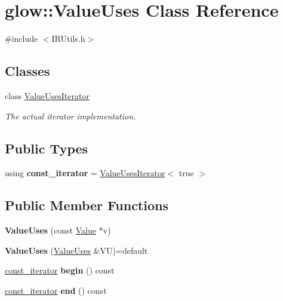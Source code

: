 \hypertarget{classglow_1_1_value_uses}{}\section{glow\+:\+:Value\+Uses Class Reference}
\label{classglow_1_1_value_uses}


{\ttfamily \#include $<$I\+R\+Utils.\+h$>$}

\subsection*{Classes}
\begin{DoxyCompactItemize}
\item 
class \hyperlink{classglow_1_1_value_uses_1_1_value_uses_iterator}{Value\+Uses\+Iterator}
\begin{DoxyCompactList}\small\item\em The actual iterator implementation. \end{DoxyCompactList}\end{DoxyCompactItemize}
\subsection*{Public Types}
\begin{DoxyCompactItemize}
\item 
\mbox{\label{classglow_1_1_value_uses_a1bf1bcc16d0a0d1de930242f63cd74a6}} 
using {\bfseries const\+\_\+iterator} = \hyperlink{classglow_1_1_value_uses_1_1_value_uses_iterator}{Value\+Uses\+Iterator}$<$ true $>$
\end{DoxyCompactItemize}
\subsection*{Public Member Functions}
\begin{DoxyCompactItemize}
\item 
\mbox{\label{classglow_1_1_value_uses_a708bfa8008a646e353de490e75eb1b32}} 
{\bfseries Value\+Uses} (const \hyperlink{classglow_1_1_value}{Value} $\ast$v)
\item 
\mbox{\label{classglow_1_1_value_uses_a02c847a6b780a58571022a1b40ae1c22}} 
{\bfseries Value\+Uses} (\hyperlink{classglow_1_1_value_uses}{Value\+Uses} \&VU)=default
\item 
\mbox{\label{classglow_1_1_value_uses_adc6b1f804d1541a360a604f2e6dabf47}} 
\hyperlink{classglow_1_1_value_uses_1_1_value_uses_iterator}{const\+\_\+iterator} {\bfseries begin} () const
\item 
\mbox{\label{classglow_1_1_value_uses_abaf0bad30d7779563f06616e720544bf}} 
\hyperlink{classglow_1_1_value_uses_1_1_value_uses_iterator}{const\+\_\+iterator} {\bfseries end} () const
\end{DoxyCompactItemize}


